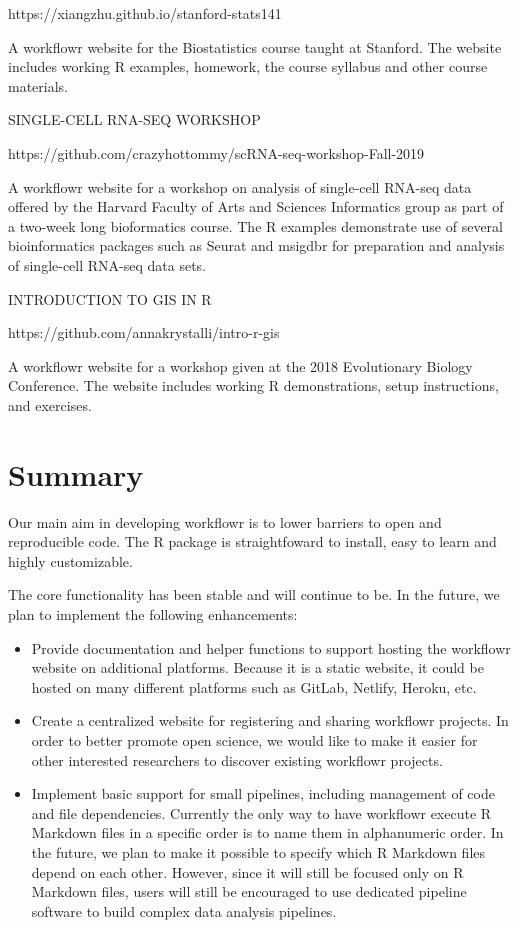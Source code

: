 \documentclass[9pt,a4paper]{extarticle}
\begin{document}
https://xiangzhu.github.io/stanford-stats141

A workflowr website for the Biostatistics course taught at Stanford. The
website includes working R examples, homework, the course syllabus and
other course materials.

SINGLE-CELL RNA-SEQ WORKSHOP

https://github.com/crazyhottommy/scRNA-seq-workshop-Fall-2019

A workflowr website for a workshop on analysis of single-cell RNA-seq
data offered by the Harvard Faculty of Arts and Sciences Informatics
group as part of a two-week long bioformatics course. The R examples
demonstrate use of several bioinformatics packages such as Seurat and
msigdbr for preparation and analysis of single-cell RNA-seq data sets.

INTRODUCTION TO GIS IN R

https://github.com/annakrystalli/intro-r-gis

A workflowr website for a workshop given at the 2018 Evolutionary
Biology Conference. The website includes working R demonstrations, setup
instructions, and exercises.

\section*{Summary}

Our main aim in developing workflowr is to lower barriers to open and
reproducible code. The R package is straightfoward to install, easy to
learn and highly customizable.

The core functionality has been stable and will continue to be. In the
future, we plan to implement the following enhancements:

\begin{itemize}

\item Provide documentation and helper functions to support hosting the
workflowr website on additional platforms. Because it is a static
website, it could be hosted on many different platforms such as GitLab,
Netlify, Heroku, etc.

\item Create a centralized website for registering and sharing workflowr
projects. In order to better promote open science, we would like to make
it easier for other interested researchers to discover existing
workflowr projects.

\item Implement basic support for small pipelines, including management
of code and file dependencies. Currently the only way to have workflowr
execute R Markdown files in a specific order is to name them in
alphanumeric order. In the future, we plan to make it possible to
specify which R Markdown files depend on each other. However, since it
will still be focused only on R Markdown files, users will still be
encouraged to use dedicated pipeline software to build complex data
analysis pipelines.

\end{itemize}
\end{document}
